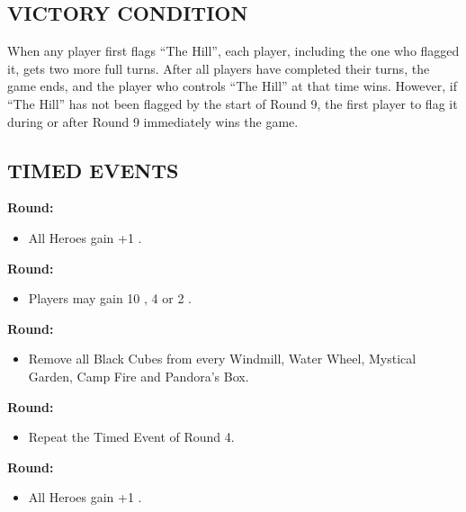 \begin{multicols*}{2}
\subsection*{\MakeUppercase{Victory Condition}}
When any player first flags ``The Hill'', each player, including the one who flagged it, gets two more full turns. After all players have completed their turns, the game ends, and the player who controls ``The Hill'' at that time wins. However, if ``The Hill'' has not been flagged by the start of Round 9, the first player to flag it during or after Round 9 immediately wins the game.

\subsection*{\MakeUppercase{Timed Events}}
\textbf{ Round:}
\begin{itemize}
  \item All Heroes gain +1 .
\end{itemize}
\textbf{ Round:}
\begin{itemize}
  \item Players may gain 10 , 4  or 2 .
\end{itemize}
\textbf{ Round:}
\begin{itemize}
  \item Remove all Black Cubes from every Windmill, Water Wheel, Mystical Garden, Camp Fire and Pandora's Box.
\end{itemize}
\textbf{ Round:}
\begin{itemize}
  \item Repeat the Timed Event of Round 4.
\end{itemize}
\textbf{ Round:}
\begin{itemize}
  \item All Heroes gain +1 .
\end{itemize}


\end{multicols*}
